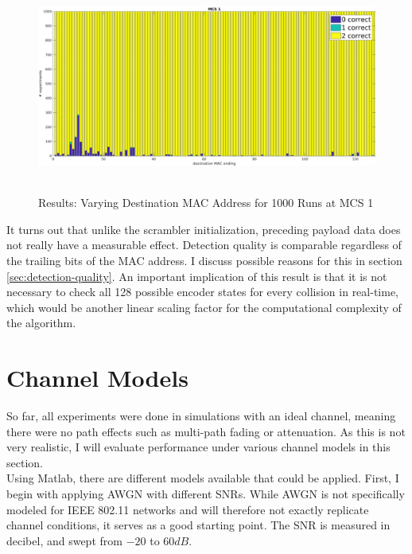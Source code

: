 \begin{figure}[H]
	\centering
	\includegraphics[height=7cm]{gfx/plots/destination}
	\caption[Results: Varying Destination \gls{MAC} Address for 1000 Runs]{Results: Varying Destination \gls{MAC} Address for 1000 Runs at MCS 1}
	\label{fig:vary_dest}
\end{figure}

It turns out that unlike the scrambler initialization, preceding payload data does not really have a measurable effect. Detection quality is comparable regardless of the trailing bits of the \gls{MAC} address. I discuss possible reasons for this in section \ref{sec:detection-quality}. An important implication of this result is that it is not necessary to check all 128 possible encoder states for every collision in real-time, which would be another linear scaling factor for the computational complexity of the algorithm.



\section{Channel Models}

So far, all experiments were done in simulations with an ideal channel, meaning there were no path effects such as multi-path fading or attenuation. As this is not very realistic, I will evaluate performance under various channel models in this section.\\

Using Matlab, there are different models available that could be applied. First, I begin with applying \gls{AWGN} with different \glspl{SNR}. While \gls{AWGN} is not specifically modeled for IEEE 802.11 networks and will therefore not exactly replicate channel conditions, it serves as a good starting point. The \gls{SNR} is measured in decibel, and swept from $ -20 $ to $ 60 dB $.

